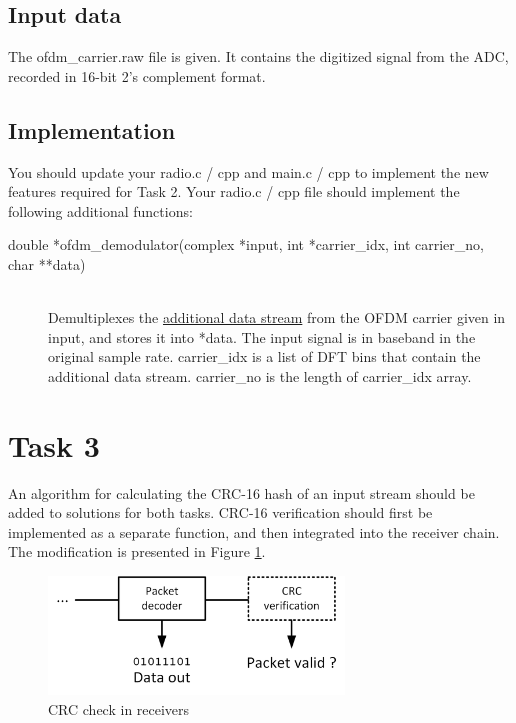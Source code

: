 \documentclass[a4paper]{article}
\begin{document}
\subsection*{Input data}
The \textsf{ofdm\_carrier.raw} file is given. It contains the digitized signal from the ADC, recorded in 16-bit 2's complement format.

\subsection*{Implementation}
You should update your \textsf{radio.c / cpp} and \textsf{main.c / cpp} to implement the new features required for Task 2. Your \textsf{radio.c / cpp} file should implement the following additional functions:
\begin{description}
	\item[double *ofdm\_demodulator(complex *input, int *carrier\_idx, int carrier\_no, char **data)]
	\,\\ Demultiplexes the \underline{additional data stream} from the OFDM carrier given in \textsf{input}, and stores it into \textsf{*data}. The input signal is in baseband in the original sample rate. \textsf{carrier\_idx} is a list of DFT bins that contain the additional data stream. \textsf{carrier\_no} is the length of \textsf{carrier\_idx} array.
\end{description}

\section*{Task 3}
An algorithm for calculating the CRC-16 hash of an input stream should be added to solutions for both tasks. CRC-16 verification should first be implemented as a separate function, and then integrated into the receiver chain. The modification is presented in Figure \ref{fig:task3}.

\begin{figure}[h!]
\centering
\includegraphics[width=0.7\textwidth]{Task3.png}
\caption{CRC check in receivers}
\label{fig:task3}
\end{figure}
\end{document}
